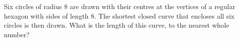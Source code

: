 Six circles of radius $8$ are drawn with their centres at the vertices of a regular hexagon with sides of length $8$. The shortest closed curve that encloses all six circles is then drawn. What is the length of this curve, to the nearest whole number?
